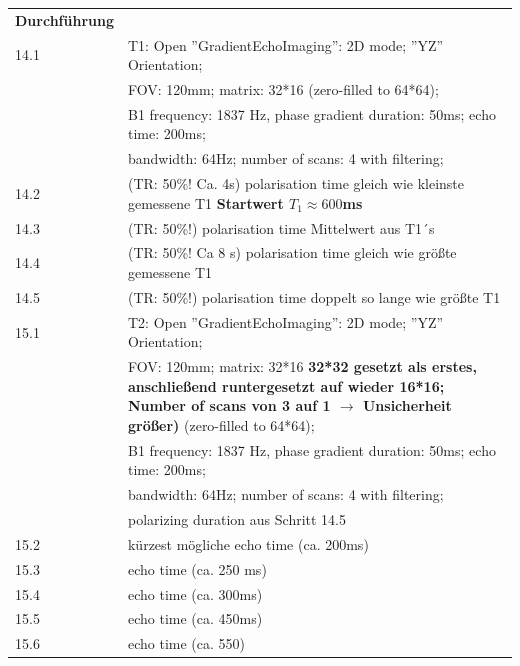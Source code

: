 \begin{tabular}{ll}
    \textbf{Durchführung} & \\

    14.1 & T1:  Open ''GradientEchoImaging'': 2D mode; ''YZ'' Orientation; \\

         &  FOV: 120mm; matrix: 32*16 (zero-filled to 64*64);  \\

         & B1 frequency: 1837 Hz, phase gradient duration: 50ms; echo time: 200ms;  \\

         &  bandwidth: 64Hz; number of scans: 4 with filtering; \\

    14.2 & (TR: 50\%! Ca. 4s) polarisation time gleich wie kleinste gemessene T1 \textbf{Startwert $T_1 \approx 600$ms}\\

    14.3 & (TR: 50\%!) polarisation time Mittelwert aus T1´s \\

    14.4 & (TR: 50\%! Ca 8 s) polarisation time gleich wie größte gemessene T1\\

    14.5 & (TR: 50\%!) polarisation time doppelt so lange wie größte T1\\

    15.1 & T2:  Open ''GradientEchoImaging'': 2D mode; ''YZ'' Orientation; \\

         &  FOV: 120mm; matrix: 32*16 
         \textbf{32*32 gesetzt als erstes, anschließend runtergesetzt auf wieder 16*16; Number of scans von 3 auf 1 $\rightarrow$ Unsicherheit größer)} (zero-filled to 64*64);  \\

         & B1 frequency: 1837 Hz, phase gradient duration: 50ms; echo time: 200ms;  \\

         &  bandwidth: 64Hz; number of scans: 4 with filtering; \\

         & polarizing duration aus Schritt 14.5 \\

    15.2 & kürzest mögliche echo time (ca. 200ms) \\

    15.3 & echo time (ca. 250 ms) \\

    15.4 & echo time (ca. 300ms) \\

    15.5 & echo time (ca. 450ms) \\

    15.6 & echo time (ca. 550)\\
\end{tabular}  



